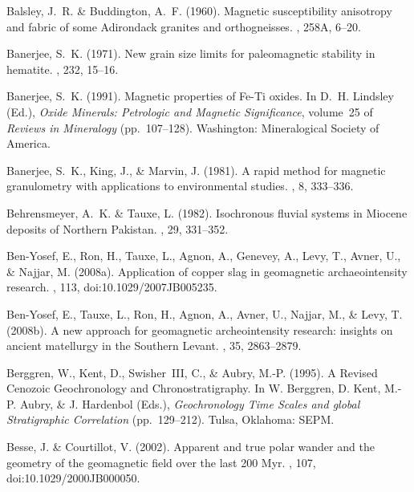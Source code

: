 Balsley, J.~R. \& Buddington, A.~F. (1960).
\newblock Magnetic susceptibility anisotropy and fabric of some Adirondack
  granites and orthogneisses.
, 258A, 6--20.

Banerjee, S.~K. (1971).
\newblock New grain size limits for paleomagnetic stability in hematite.
, 232, 15--16.

Banerjee, S.~K. (1991).
\newblock Magnetic properties of Fe-Ti oxides.
\newblock In D.~H. Lindsley (Ed.), {\em Oxide Minerals: Petrologic and Magnetic
  Significance}, volume~25 of {\em Reviews in Mineralogy}  (pp.\ 107--128).
  Washington: Mineralogical Society of America.

Banerjee, S.~K., King, J., \& Marvin, J. (1981).
\newblock A rapid method for magnetic granulometry with applications to
  environmental studies.
, 8, 333--336.

Behrensmeyer, A.~K. \& Tauxe, L. (1982).
\newblock Isochronous fluvial systems in Miocene deposits of Northern Pakistan.
, 29, 331--352.

Ben-Yosef, E., Ron, H., Tauxe, L., Agnon, A., Genevey, A., Levy, T., Avner, U.,
  \& Najjar, M. (2008a).
\newblock Application of copper slag in geomagnetic archaeointensity research.
, 113, doi:10.1029/2007JB005235.

Ben-Yosef, E., Tauxe, L., Ron, H., Agnon, A., Avner, U., Najjar, M., \& Levy,
  T. (2008b).
\newblock A new approach for geomagnetic archeointensity research: insights on
  ancient matellurgy in the Southern Levant.
, 35, 2863--2879.

Berggren, W., Kent, D., Swisher~III, C., \& Aubry, M.-P. (1995).
\newblock A Revised Cenozoic Geochronology and Chronostratigraphy.
\newblock In W. Berggren, D. Kent, M.-P. Aubry, \& J. Hardenbol (Eds.), {\em
  Geochronology Time Scales and global Stratigraphic Correlation}  (pp.\
  129--212). Tulsa, Oklahoma: SEPM.

Besse, J. \& Courtillot, V. (2002).
\newblock Apparent and true polar wander and the geometry of the geomagnetic
  field over the last 200 Myr.
, 107, doi:10.1029/2000JB000050.

